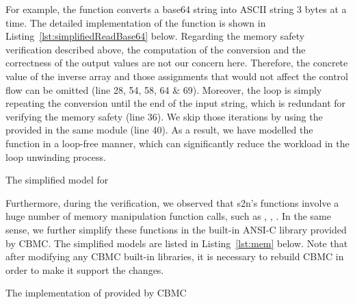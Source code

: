 For example, the function  converts a base64 string into ASCII string 3 bytes at a time. The detailed implementation of the function is shown in Listing~\ref{lst:simplifiedReadBase64} below. Regarding the memory safety verification described above, the computation of the conversion and the correctness of the output values are not our concern here. Therefore, the concrete value of the inverse array and those assignments that would not affect the control flow can be omitted (line 28, 54, 58, 64 \& 69). Moreover, the  loop is simply repeating the conversion until the end of the input string, which is redundant for verifying the memory safety (line 36). We skip those iterations by using the  provided in the same module (line 40). As a result, we have modelled the function in a loop-free manner, which can significantly reduce the workload in the loop unwinding process.  

\begin{listing}
\caption{The simplified model for }
\label{lst:simplifiedReadBase64}
\end{listing}

Furthermore, during the verification, we observed that s2n's functions involve a huge number of memory manipulation function calls, such as , , . In the same sense, we further simplify these functions in the built-in ANSI-C library provided by CBMC. The simplified models are listed in Listing~\ref{lst:mem} below. Note that after modifying any CBMC built-in libraries, it is necessary to rebuild CBMC in order to make it support the changes.

\begin{listing}
\caption{The implementation of  provided by CBMC}
\label{lst:mem}
\end{listing}
